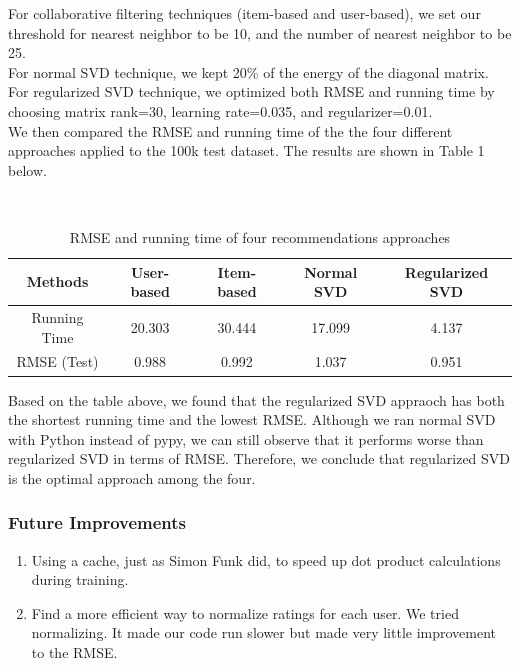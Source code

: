 \documentclass[12pt]{article}
\begin{document}
\noindent For collaborative filtering techniques (item-based and user-based), we set our threshold for nearest neighbor to be 10, and the number of nearest neighbor to be 25.\\

\noindent For normal SVD technique, we kept 20\% of the energy of the diagonal matrix.\\

\noindent For regularized SVD technique, we optimized both RMSE and running time by choosing matrix rank=30, learning rate=0.035, and regularizer=0.01.\\

\noindent We then compared the RMSE and running time of the the four different approaches applied to the 100k test dataset. The results are shown in Table 1 below.

\begin{table}[H]
\caption{RMSE and running time of four recommendations approaches}
$      $
\centering
\begin{tabular}{c c c c c}
\hline\hline
Methods & User-based & Item-based & Normal SVD & Regularized SVD \\ [0.5ex]
\hline
Running Time & 20.303 & 30.444 & 17.099 & 4.137 \\
RMSE (Test) & 0.988 & 0.992 & 1.037 & 0.951 \\ [1ex]
\hline
\end{tabular}
\end{table}

\noindent Based on the table above, we found that the regularized SVD appraoch has both the shortest running time and the lowest RMSE. Although we ran normal SVD with Python instead of pypy, we can still observe that it performs worse than regularized SVD in terms of RMSE. Therefore, we conclude that regularized SVD is the optimal approach among the four.


\subsubsection*{Future Improvements}
\begin{enumerate}
\item Using a cache, just as Simon Funk did, to speed up dot product 
calculations during training.
\item Find a more efficient way to normalize ratings 
for each user.
We tried normalizing. It made our code run slower but made very
little improvement to the RMSE. 
\end{enumerate}
\end{document}
